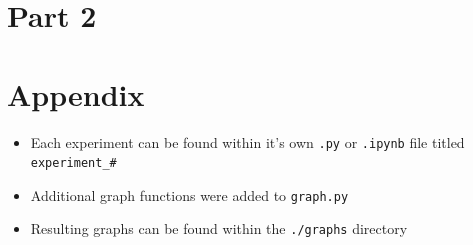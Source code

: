 \documentclass{article}
\begin{document}
\section{Part 2}



\appendix
\section{Appendix}

\begin{itemize}
    \item Each experiment can be found within it's own \verb|.py| or \verb|.ipynb| file titled \verb|experiment_#|
    \item Additional graph functions were added to \verb|graph.py|
    \item Resulting graphs can be found within the \verb|./graphs| directory
\end{itemize}
\end{document}
